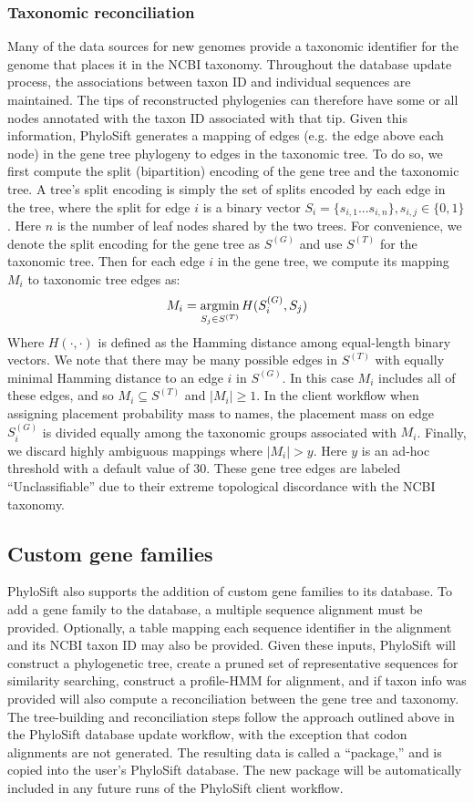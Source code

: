\documentclass[10pt]{article}
\newcommand{\argmin}{\operatornamewithlimits{argmin}}
\begin{document}
\subsubsection*{Taxonomic reconciliation}
Many of the data sources for new genomes provide a taxonomic identifier for the genome that places it in the NCBI taxonomy.
Throughout the database update process, the associations between taxon ID and individual sequences are maintained.
The tips of reconstructed phylogenies can therefore have some or all nodes annotated with the taxon ID associated with that tip.
Given this information, PhyloSift generates a mapping of edges (e.g. the edge above each node) in the gene tree phylogeny to edges in the taxonomic tree.
To do so, we first compute the split (bipartition) encoding of the gene tree and the taxonomic tree.
A tree's split encoding is simply the set of splits encoded by each edge in the tree, where the split for edge $i$ is a binary vector $S_i = \{s_{i,1}...s_{i,n}\}, s_{i,j} \in \{0,1\}$.
Here $n$ is the number of leaf nodes shared by the two trees.
For convenience, we denote the split encoding for the gene tree as $S^{(G)}$ and use $S^{(T)}$ for the taxonomic tree.
Then for each edge $i$ in the gene tree, we compute its mapping $M_i$ to taxonomic tree edges as:
$$
M_i = \argmin_{S_j \in S^{(T)}} H(S^{(G)}_i, S_j)
$$
Where $H(\cdot,\cdot)$ is defined as the Hamming distance among equal-length binary vectors.
We note that there may be many possible edges in $S^{(T)}$ with equally minimal Hamming distance to an edge $i$ in $S^{(G)}$.
In this case $M_i$ includes all of these edges, and so $M_i \subseteq S^{(T)}$ and $|M_i| \geq 1$.
In the client workflow when assigning placement probability mass to names, the placement mass on edge $S^{(G)}_i$ is divided equally among the taxonomic groups associated with $M_i$.
Finally, we discard highly ambiguous mappings where $|M_i|>y$.
Here $y$ is an ad-hoc threshold with a default value of 30.
These gene tree edges are labeled ``Unclassifiable'' due to their extreme topological discordance with the NCBI taxonomy.

\subsection*{Custom gene families}

PhyloSift also supports the addition of custom gene families to its database.
To add a gene family to the database, a multiple sequence alignment must be provided.
Optionally, a table mapping each sequence identifier in the alignment and its NCBI taxon ID may also be provided.
Given these inputs, PhyloSift will construct a phylogenetic tree, create a pruned set of representative sequences for similarity searching, construct a profile-HMM for alignment, and if taxon info was provided will also compute a reconciliation between the gene tree and taxonomy.
The tree-building and reconciliation steps follow the approach outlined above in the PhyloSift database update workflow, with the exception that codon alignments are not generated.
The resulting data is called a ``package,'' and is copied into the user's PhyloSift database.
The new package will be automatically included in any future runs of the PhyloSift client workflow.
\end{document}
